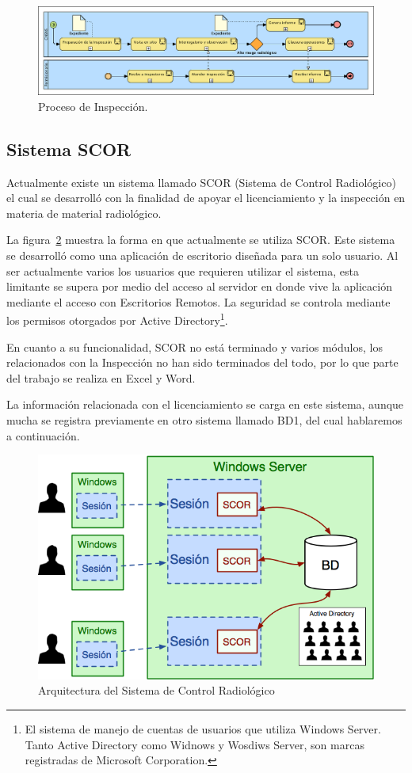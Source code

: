 \documentclass[10pt]{book}
\begin{document}
\begin{figure}[htbp!]
	\begin{center}
		\includegraphics[width=.8\textwidth]{images/procesoInsp}
		\caption{Proceso de Inspección.}
		\label{fig:procesoInsp}
	\end{center}
\end{figure}


\subsection{Sistema SCOR}

	Actualmente existe un sistema llamado SCOR (Sistema de Control Radiológico) el cual se desarrolló con la finalidad de apoyar el licenciamiento y la inspección en materia de material radiológico.
	
	La figura~\ref{fig:scor} muestra la forma en que actualmente se utiliza SCOR. Este sistema se desarrolló como una aplicación de escritorio diseñada para un solo usuario. Al ser actualmente varios los usuarios que requieren utilizar el sistema, esta limitante se supera por medio del acceso al servidor en donde vive la aplicación mediante el acceso con Escritorios Remotos. La seguridad se controla mediante los permisos otorgados por Active Directory\footnote{El sistema de manejo de cuentas de usuarios que utiliza Windows Server. Tanto Active Directory como Widnows y Wosdiws Server, son marcas registradas de Microsoft Corporation.}.
	
	En cuanto a su funcionalidad, SCOR no está terminado y varios módulos, los relacionados con la Inspección no han sido terminados del todo, por lo que parte del trabajo se realiza en Excel y Word.
	
	La información relacionada con el licenciamiento se carga en este sistema, aunque mucha se registra previamente en otro sistema llamado BD1, del cual hablaremos a continuación.
	
	
\begin{figure}[htbp!]
	\begin{center}
		\includegraphics[width=.7\textwidth]{images/scor}
		\caption{Arquitectura del Sistema de Control Radiológico}
		\label{fig:scor}
	\end{center}
\end{figure}
\end{document}
